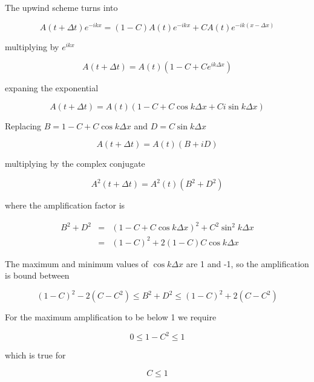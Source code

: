 The upwind scheme turns into

\begin{equation}
A(t+\Delta t)e^{-ikx}  = (1-C) A(t)e^{-ikx} + CA(t)e^{-ik(x-\Delta x)}
\end{equation}

multiplying by $e^{ikx}$

\begin{equation}
A(t+\Delta t)  = A(t) \left(1 - C  +C e^{ik\Delta x}\right)
\end{equation}


expaning the exponential 

\begin{equation}
A(t+\Delta t)  = A(t) \left(1 - C + C\cos k\Delta x + C i\sin k\Delta x\right)
\end{equation}

Replacing $B = 1 - C + C\cos k\Delta x$ and $D = C\sin k\Delta x$

\begin{equation}
A(t+\Delta t)  = A(t) \left(B + iD\right)
\end{equation}

multiplying by the complex conjugate 

\begin{equation}
A^2(t+\Delta t)  = A^2(t) \left(B^2  + D^2\right)
\end{equation}

where the amplification factor is 

\begin{eqnarray}
B^2+D^2 &=& \left(1 - C + C\cos k\Delta x\right)^2 + C^2\sin^2 k\Delta x\\
&=&(1-C)^2 + 2(1-C)C\cos k\Delta x 
\end{eqnarray}


The maximum and minimum values of $\cos k\Delta x$ are 1 and -1, so the amplification is bound between 

\begin{equation}
(1-C)^2 - 2(C-C^2) \leq B^2+D^2 \leq (1-C)^2 + 2(C-C^2) 
\end{equation}

For the maximum amplification to be below 1 we require 

\begin{equation}
0 \leq 1 - C^2 \leq 1 
\end{equation}

which is true for 

\begin{equation}
\boxed{
C \leq 1
}
\end{equation}

